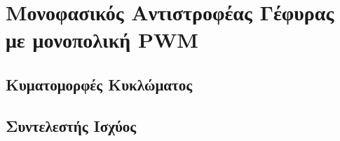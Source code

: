 \section{Μονοφασικός Αντιστροφέας Γέφυρας με μονοπολική PWM}





\subsection{Κυματομορφές Κυκλώματος}







\subsection{Συντελεστής Ισχύος}
